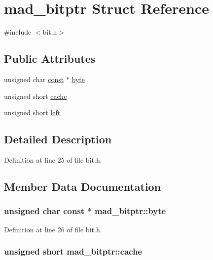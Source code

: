 \hypertarget{structmad__bitptr}{}\section{mad\+\_\+bitptr Struct Reference}
\label{structmad__bitptr}


{\ttfamily \#include $<$bit.\+h$>$}

\subsection*{Public Attributes}
\begin{DoxyCompactItemize}
\item 
unsigned char \hyperlink{getopt1_8c_a2c212835823e3c54a8ab6d95c652660e}{const} $\ast$ \hyperlink{structmad__bitptr_a14f78c3eb4ce7677fc5cde553202cf4d}{byte}
\item 
unsigned short \hyperlink{structmad__bitptr_a175b8ed6a6b78c10d3fdbefe6b31efcc}{cache}
\item 
unsigned short \hyperlink{structmad__bitptr_ade0841b075cdd7a3285e1bd803ef8b95}{left}
\end{DoxyCompactItemize}


\subsection{Detailed Description}


Definition at line 25 of file bit.\+h.



\subsection{Member Data Documentation}
\subsubsection[{\texorpdfstring{byte}{byte}}]{\setlength{\rightskip}{0pt plus 5cm}unsigned char {\bf const} $\ast$ mad\+\_\+bitptr\+::byte}\hypertarget{structmad__bitptr_a14f78c3eb4ce7677fc5cde553202cf4d}{}\label{structmad__bitptr_a14f78c3eb4ce7677fc5cde553202cf4d}


Definition at line 26 of file bit.\+h.

\subsubsection[{\texorpdfstring{cache}{cache}}]{\setlength{\rightskip}{0pt plus 5cm}unsigned short mad\+\_\+bitptr\+::cache}\hypertarget{structmad__bitptr_a175b8ed6a6b78c10d3fdbefe6b31efcc}{}\label{structmad__bitptr_a175b8ed6a6b78c10d3fdbefe6b31efcc}


